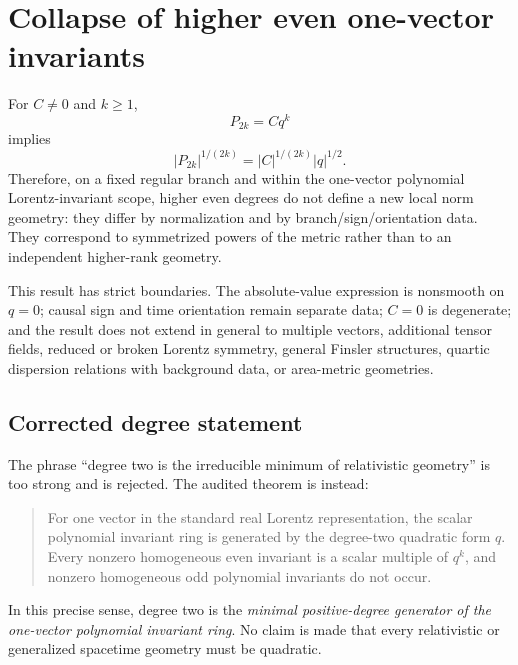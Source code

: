 \documentclass[11pt,a4paper]{article}
\begin{document}
\section{Collapse of higher even one-vector invariants}
For $C\neq0$ and $k\ge1$,
\begin{equation}
P_{2k}=Cq^k
\end{equation}
implies
\begin{equation}
\boxed{|P_{2k}|^{1/(2k)}
=|C|^{1/(2k)}|q|^{1/2}}.
\label{eq:evencollapse}
\end{equation}
Therefore, on a fixed regular branch and within the one-vector polynomial Lorentz-invariant scope, higher even degrees do not define a new local norm geometry: they differ by normalization and by branch/sign/orientation data.  They correspond to symmetrized powers of the metric rather than to an independent higher-rank geometry.

This result has strict boundaries.  The absolute-value expression is nonsmooth on $q=0$; causal sign and time orientation remain separate data; $C=0$ is degenerate; and the result does not extend in general to multiple vectors, additional tensor fields, reduced or broken Lorentz symmetry, general Finsler structures, quartic dispersion relations with background data, or area-metric geometries.

\subsection{Corrected degree statement}
The phrase ``degree two is the irreducible minimum of relativistic geometry'' is too strong and is rejected.  The audited theorem is instead:
\begin{quote}
For one vector in the standard real Lorentz representation, the scalar polynomial invariant ring is generated by the degree-two quadratic form $q$.  Every nonzero homogeneous even invariant is a scalar multiple of $q^k$, and nonzero homogeneous odd polynomial invariants do not occur.
\end{quote}
In this precise sense, degree two is the \emph{minimal positive-degree generator of the one-vector polynomial invariant ring}.  No claim is made that every relativistic or generalized spacetime geometry must be quadratic.
\end{document}
